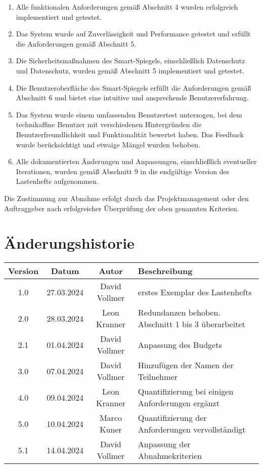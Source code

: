 \documentclass{article}
\begin{document}
\begin{enumerate}
    \item Alle funktionalen Anforderungen gemäß Abschnitt 4 wurden erfolgreich implementiert und getestet.
    \item Das System wurde auf Zuverlässigkeit und Performance getestet und erfüllt die Anforderungen gemäß Abschnitt 5.
    \item Die Sicherheitsmaßnahmen des Smart-Spiegels, einschließlich Datenschutz und Datenschutz, wurden gemäß Abschnitt 5 implementiert und getestet.
    \item Die Benutzeroberfläche des Smart-Spiegels erfüllt die Anforderungen gemäß Abschnitt 6 und bietet eine intuitive und ansprechende Benutzererfahrung.
    \item Das System wurde einem umfassenden Benutzertest unterzogen, bei dem technikaffine Benutzer mit verschiedenen Hintergründen die Benutzerfreundlichkeit und Funktionalität bewertet haben. Das Feedback wurde berücksichtigt und etwaige Mängel wurden behoben.
    \item Alle dokumentierten Änderungen und Anpassungen, einschließlich eventueller Iterationen, wurden gemäß Abschnitt 9 in die endgültige Version des Lastenhefts aufgenommen.
\end{enumerate}

Die Zustimmung zur Abnahme erfolgt durch das Projektmanagement oder den Auftraggeber nach erfolgreicher Überprüfung der oben genannten Kriterien.


\section{Änderungshistorie}
\begin{tabular}{|c|c|c|l|}
    \hline
    Version & Datum & Autor & Beschreibung \\
    \hline
    1.0 & 27.03.2024 & David Vollmer & erstes Exemplar des Lastenhefts \\
    \hline
    2.0 & 28.03.2024 & Leon Kranner & Redundanzen behoben. Abschnitt 1 bis 3 überarbeitet \\
    \hline
    2.1 & 01.04.2024 & David Vollmer & Anpassung des Budgets \\
    \hline
    3.0 & 07.04.2024 & David Vollmer & Hinzufügen der Namen der Teilnehmer \\
    \hline
    4.0 & 09.04.2024 & Leon Kranner & Quantifizierung bei einigen Anforderungen ergänzt \\
    \hline
    5.0 & 10.04.2024 & Marco Kuner & Quantifizierung der Anforderungen vervollständigt \\
    \hline
    5.1 & 14.04.2024 & David Vollmer & Anpassung der Abnahmekriterien \\
    \hline
\end{tabular}
\end{document}
